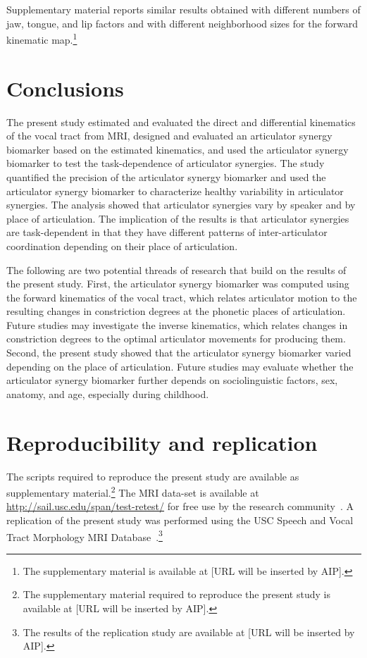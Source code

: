 \documentclass[preprint]{JASAnew}\usepackage[]{graphicx}\usepackage[]{color}
\begin{document}
Supplementary material reports similar results obtained with different numbers of jaw, tongue, and lip factors and with different neighborhood sizes for the forward kinematic map.\footnote{The supplementary material is available at [URL will be inserted by AIP].}




\section{Conclusions}

The present study estimated and evaluated the direct and differential kinematics of the vocal tract from MRI, 
%
designed and evaluated an articulator synergy biomarker based on the estimated kinematics, and
%
used the articulator synergy biomarker to test the task-dependence of articulator synergies.
%
The study quantified the precision of the articulator synergy biomarker and used the articulator synergy biomarker to characterize healthy variability in articulator synergies. 
%
The analysis showed that articulator synergies vary by speaker and by place of articulation. 
%
The implication of the results is that articulator synergies are task-dependent in that they have different patterns of inter-articulator coordination depending on their place of articulation. 



The following are two potential threads of research that build on the results of the present study.
First, the articulator synergy biomarker was computed using the forward kinematics of the vocal tract, which relates articulator motion to the resulting changes in constriction degrees at the phonetic places of articulation. Future studies may investigate the inverse kinematics, which relates changes in constriction degrees to the optimal articulator movements for producing them. 
%
Second, the present study showed that the articulator synergy biomarker varied depending on the place of articulation. Future studies may evaluate whether the articulator synergy biomarker further depends on sociolinguistic factors, sex, anatomy, and age, especially during childhood.

\section{Reproducibility and replication}

The scripts required to reproduce the present study are available as supplementary material.\footnote{The supplementary material required to reproduce the present study is available at [URL will be inserted by AIP].}
%
The MRI data-set is available at \url{http://sail.usc.edu/span/test-retest/} for free use by the research community~\citep[see][]{toger2017test}.
%
A replication of the present study was performed using the USC Speech and Vocal Tract Morphology MRI Database~\citep{sorensen2017database}.\footnote{The results of the replication study are available at [URL will be inserted by AIP].}
\end{document}
